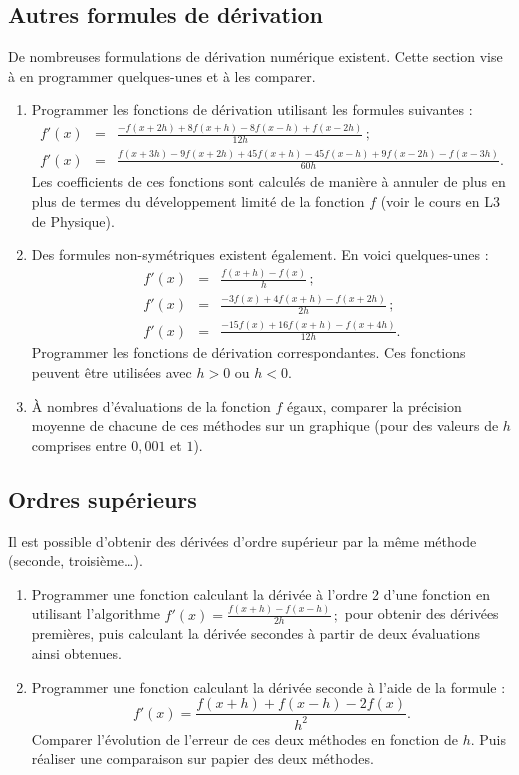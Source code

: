 \subsection{Autres formules de dérivation}

De  nombreuses  formulations  de  dérivation  numérique  existent.  Cette
section vise à en programmer quelques-unes et à les comparer.
\begin{enumerate}
\item Programmer les fonctions de dérivation utilisant les formules suivantes :
  \begin{eqnarray*}
f'(x) &=& \frac{-f(x+2h)+8f(x+h)-8f(x-h)+f(x-2h)}{12h}\,; \\
f'(x) &=& \frac{f(x+3h)-9f(x+2h)+45f(x+h)-45f(x-h)+9f(x-2h)-f(x-3h)}{60h}.
  \end{eqnarray*}
Les coefficients de ces fonctions sont calculés de manière à annuler de plus en
plus de termes du développement limité de la fonction $f$ (voir le cours en L3 de Physique).
\item Des formules non-symétriques existent également. En voici quelques-unes :
   \begin{eqnarray*}
f'(x) &=& \frac{f(x+h)-f(x)}{h}\,;\\
f'(x) &=& \frac{-3f(x)+4f(x+h) -f(x+2h)}{2h}\,;\\
f'(x) &=& \frac{-15f(x)+16f(x+h) -f(x+4h)}{12h}.
  \end{eqnarray*}
 Programmer les fonctions de dérivation correspondantes. Ces fonctions peuvent être utilisées avec $h>0$ ou $h<0$.
\item  À nombres  d'évaluations de  la fonction  $f$ égaux,  comparer la
  précision moyenne de chacune de  ces méthodes sur un graphique (pour
  des valeurs de $h$ comprises entre $0,001$ et $1$).
\end{enumerate}



\subsection{Ordres supérieurs \sc{[Facultatif]}}
Il est possible  d'obtenir des dérivées d'ordre supérieur  par la même
méthode (seconde, troisième\ldots).
\begin{enumerate}
\item Programmer une  fonction calculant la dérivée à  l'ordre 2 d'une
  fonction        en       utilisant        l'algorithme       $f'(x)=
  \frac{f(x+h)-f(x-h)}{2h}\,;$  pour  obtenir des  dérivées  premières,
  puis  calculant la  dérivée secondes  à partir  de deux  évaluations ainsi
  obtenues.
\item Programmer une fonction calculant la dérivée seconde à l'aide de
  la formule :
$$f'(x)=  \frac{f(x+h)+f(x-h)-2f(x)}{h^2}.$$  Comparer l'évolution  de
  l'erreur de ces deux méthodes en  fonction de $h$. Puis réaliser une
  comparaison \og{} sur papier \fg{} des deux méthodes.
\end{enumerate}

